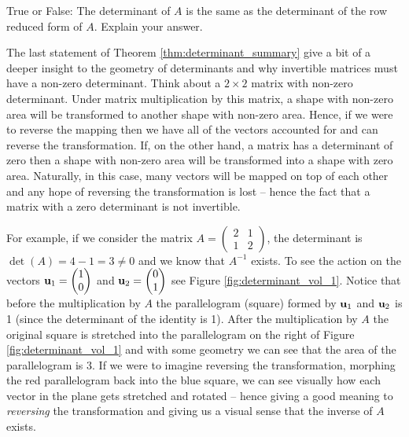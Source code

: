 \begin{problem}
    True or False: The determinant of $A$ is the same as the determinant of the row
    reduced form of $A$.  Explain your answer.
\end{problem}


The last statement of Theorem \ref{thm:determinant_summary} give a bit of a deeper insight
to the geometry of determinants and why invertible matrices must have a non-zero
determinant.  Think about a $2 \times 2$ matrix with non-zero determinant.  Under matrix
multiplication by this matrix, a shape with non-zero area will be transformed to another
shape with non-zero area.  Hence, if we were to reverse the mapping then we have all of
the vectors accounted for and can reverse the transformation.  If, on the other hand, a
matrix has a determinant of zero then a shape with non-zero area will be transformed into
a shape with zero area.  Naturally, in this case, many vectors will be mapped on top of
each other and any hope of reversing the transformation is lost -- hence the fact that a
matrix with a zero determinant is not invertible.

For example, if we consider the matrix $A = \begin{pmatrix} 2&1\\1&2\end{pmatrix}$, the
determinant is $\det(A) = 4-1=3 \ne 0$ and we know that $A^{-1}$ exists.  To see the
action on the vectors ${\bf u}_1 = \begin{pmatrix}1\\0\end{pmatrix}$ and ${\bf u}_2 =
\begin{pmatrix}0\\1\end{pmatrix}$ see Figure \ref{fig:determinant_vol_1}.  Notice that
before the multiplication by $A$ the parallelogram (square) formed by ${\bf u}_1$ and ${\bf u}_2$ is 1
(since the determinant of the identity is 1).  After the multiplication by $A$ the
original square is stretched into the parallelogram on the right of Figure
\ref{fig:determinant_vol_1} and with some geometry we can see that the area of the
parallelogram is $3$.  If we were to imagine reversing the transformation, morphing the
red parallelogram back into the blue square, we can see visually how each vector in the plane gets
stretched and rotated -- hence giving a good meaning to {\it reversing} the
transformation and giving us a visual sense that the inverse of $A$ exists.

